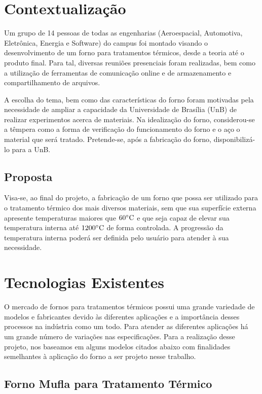 \section{Contextualização}

Um grupo de 14 pessoas de todas as engenharias (Aeroespacial, Automotiva, Eletrônica, Energia e Software) do campus foi montado visando o desenvolvimento de um forno para tratamentos térmicos, desde a teoria até o produto final. Para tal, diversas reuniões presenciais foram realizadas, bem como a utilização de ferramentas de comunicação online e de armazenamento e compartilhamento de arquivos.

A escolha do tema, bem como das características do forno foram motivadas pela necessidade de ampliar a capacidade da Universidade de Brasília (UnB) de realizar experimentos acerca de materiais. Na idealização do forno, considerou-se a têmpera como a forma de verificação do funcionamento do forno e o aço o material que será tratado. Pretende-se, após a fabricação do forno, disponibilizá-lo para a UnB.

\subsection{Proposta}

Visa-se, ao final do projeto, a fabricação de um forno que possa ser utilizado para o tratamento térmico dos mais diversos materiais, sem que sua superfície externa apresente temperaturas maiores que $60 \degree \text{C}$ e que seja capaz de elevar sua temperatura interna até $1200 \degree \text{C}$ de forma controlada. A progressão da temperatura interna poderá ser definida pelo usuário para atender à sua necessidade.

\section{Tecnologias Existentes}

O mercado de fornos para tratamentos térmicos possui uma grande variedade de modelos e fabricantes devido às diferentes aplicações e a importância desses processos na indústria como um todo. Para atender as diferentes aplicações há um grande número de variações nas especificações. Para a realização desse projeto, nos baseamos em alguns modelos citados abaixo com finalidades semelhantes à aplicação do forno a ser projeto nesse trabalho.

\subsection{Forno Mufla para Tratamento Térmico}

